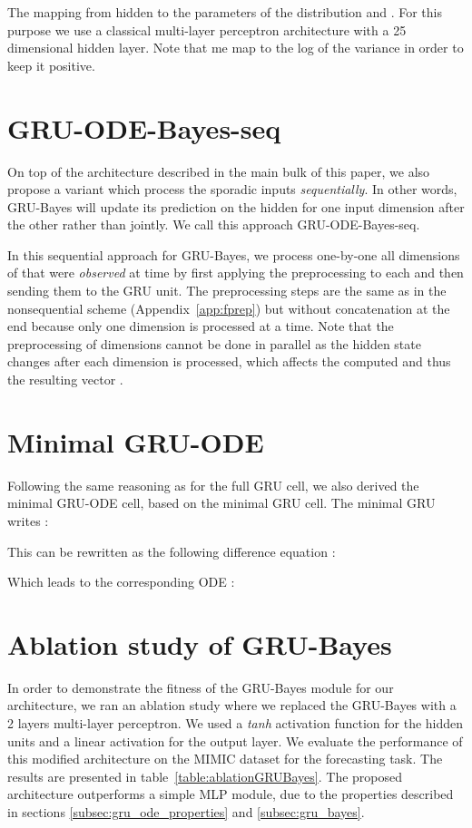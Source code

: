 \documentclass{article}
\begin{document}
The mapping from hidden  to the parameters of the distribution  and . For this purpose we use a classical multi-layer perceptron architecture with a 25 dimensional hidden layer. Note that me map to the log of the variance in order to keep it positive.

\section{GRU-ODE-Bayes-seq}
\label{app:gru-seq}
On top of the architecture described in the main bulk of this paper, we also propose a variant which process the sporadic inputs \emph{sequentially}. In other words, GRU-Bayes will update its prediction on the hidden  for one input dimension after the other rather than jointly. We call this approach GRU-ODE-Bayes-seq.

In this sequential approach for GRU-Bayes, we process one-by-one all dimensions of   that were \emph{observed} at time  by first applying the preprocessing to each and then sending them to the GRU unit.
The preprocessing steps are the same as in the nonsequential scheme (Appendix~\ref{app:fprep}) but without concatenation at the end because only one dimension is processed at a time.
Note that the preprocessing of dimensions cannot be done in parallel as the hidden state  changes after each dimension is processed, which affects the computed   and thus the resulting vector .


\section{Minimal GRU-ODE}
\label{app:gru-minimal}
Following the same reasoning as for the full GRU cell, we also derived the minimal GRU-ODE cell, based on the minimal GRU cell. The minimal GRU writes :



This can be rewritten as the following difference equation : 




Which leads to the corresponding ODE :



\section{Ablation study of GRU-Bayes}
\label{app:ablation_bayes}
In order to demonstrate the fitness of the GRU-Bayes module for our architecture, we ran an ablation study where we replaced the GRU-Bayes with a 2 layers multi-layer perceptron. We used a \emph{tanh} activation function for the hidden units and a linear activation for the output layer. We evaluate the performance of this modified architecture on the MIMIC dataset for the forecasting task. The results are presented in table~\ref{table:ablationGRUBayes}. The proposed architecture outperforms a simple MLP module, due to the properties described in sections \ref{subsec:gru_ode_properties} and \ref{subsec:gru_bayes}.
\end{document}
